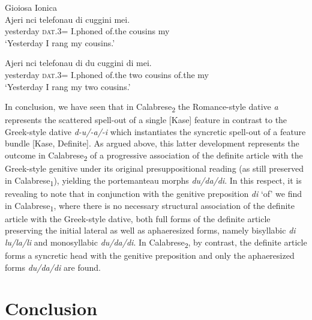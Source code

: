 \documentclass[output=paper,modfonts,nonflat,colorlinks,citecolor=brown]{langsci/langscibook}
\begin{document}
\ea\label{ex:ledgeway:29}
  Gioiosa Ionica\\
\ea
	\gll Ajeri  nci  telefonau  di  cuggini  mei.\\
    yesterday  \textsc{dat}.3=  I.phoned  of.the  cousins  my\\
    \glt `Yesterday I rang my cousins.'

\ex
	\gll Ajeri  nci  telefonau  di  du  cuggini  di  mei.\\
    yesterday  \textsc{dat}.3=  I.phoned  of.the  two  cousins  of.the  my\\
    \glt `Yesterday I rang my two cousins.'
    \z
    \z
    
In conclusion, we have seen that in Calabrese\textsubscript{2} the Romance-style dative \textit{a} represents the scattered spell-out of a single [Kase] feature in contrast to the Greek-style dative \textit{d-u/-a/-i} which instantiates the syncretic spell-out of a feature bundle [Kase, Definite]. As argued above, this latter development represents the outcome in Calabrese\textsubscript{2} of a progressive association of the definite article with the Greek-style genitive under its original presuppositional reading (as still preserved in Calabrese\textsubscript{1}), yielding the portemanteau morphs \textit{du/da/di}. In this respect, it is revealing to note that in conjunction with the genitive preposition \textit{di} ‘of’ we find in Calabrese\textsubscript{1}, where there is no necessary structural association of the definite article with the Greek-style dative, both full forms of the definite article preserving the initial lateral as well as aphaeresized forms, namely bisyllabic \textit{di lu/la/li} and monosyllabic \textit{du/da/di}. In Calabrese\textsubscript{2}, by contrast, the definite article forms a syncretic head with the genitive preposition and only the aphaeresized forms \textit{du/da/di} are found.

\section{Conclusion}
\end{document}
